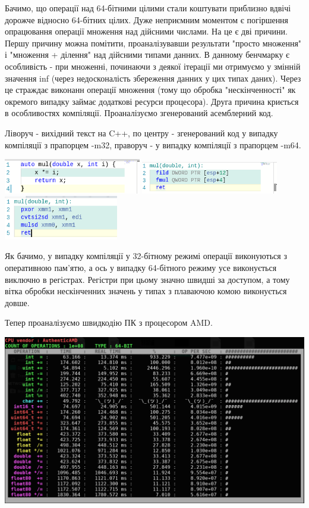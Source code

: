 Бачимо, що операції над 64-бітними цілими стали коштувати приблизно вдвічі дорожче відносно 64-бітних цілих. Дуже неприємним моментом є погіршення опрацювання операції множення над дійсними числами. На це є дві причини. Першу причину можна помітити, проаналізувавши результати "просто множення" і "множення + ділення" над дійсними типами данних.  В данному бенчмарку є особливість - при множенні, починаючи з деякої ітерації ми отримуємо у змінній значення inf (через недосконалість збереження данних у цих типах даних). Через це страждає виконанн операції множення (тому що обробка "нескінченності" як окремого випадку займає додаткові ресурси процесора). 
Друга причина криється в особливостях компіляції. Проаналізуємо згенерований асемблерний код.

Ліворуч - вихідний текст на C++, по центру - згенерований код у випадку компіляції з прапорцем -m32, праворуч - у випадку компіляції з прапорцем -m64. 


\includegraphics[width = 6cm]{img/screencpp.png}
\includegraphics[width = 6cm]{img/screenAsm32.png}
\includegraphics[width = 5cm]{img/screenAsm64.png}

Як бачимо, у випадку компіляції у 32-бітному режимі операції виконуються з оперативною пам'ятю, а ось у випадку 64-бітного режиму усе виконується виключно в регістрах. Регістри при цьому значно швидші за доступом, а тому вітка обробки нескінченних значень у типах з плаваючою комою виконується довше.

Тепер проаналізуємо швидкодію ПК з процесором AMD.

\includegraphics[width = 16cm]{img/amd64.png}

